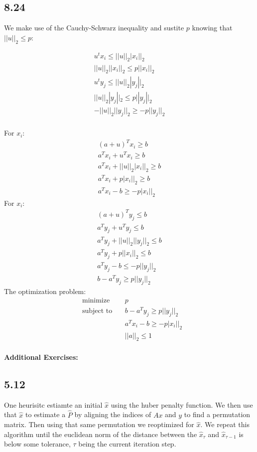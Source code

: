 \documentclass[12pt]{article}
\newenvironment{proposition}[2][Proposition]{\begin{trivlist}
\item[\hskip \labelsep {\bfseries #1}\hskip \labelsep {\bfseries #2.}]}{\end{trivlist}}
\begin{document}
\subsection*{8.24}
We make use of the Cauchy-Schwarz inequality and sustite $p$ knowing that $||u||_2 \le p$:
\begin{proposition}{1}
\begin{align}
u^tx_i \le ||u||_2|x_i||_2\\
||u||_2||x_i||_2 \le p||x_i||_2\\
u^ty_j \le ||u||_2|y_j||_2\\
||u||_2|y_j||_2 \le p||y_j||_2\\
-||u||_2||y_j||_2 \ge -p||y_j||_2\\
\end{align}
\end{proposition}
For $x_i$:
\begin{equation*}
\begin{aligned}
(a+u)^Tx_i \ge b\\
a^Tx_i+u^Tx_i \ge b\\
a^Tx_i+||u||_2|x_i||_2 \ge b\\
a^Tx_i+p|x_i||_2 \ge b\\
a^Tx_i-b \ge -p|x_i||_2
\end{aligned}
\end{equation*}
For $x_i$:
\begin{equation*}
\begin{aligned}
(a+u)^Ty_j \le b\\
a^Ty_j+u^Ty_j \le b\\
a^Ty_j+||u||_2||y_j||_2 \le b\\
a^Ty_j+p||x_i||_2 \le b\\
a^Ty_j-b \le -p||y_j||_2\\
b-a^Ty_j \ge p||y_j||_2
\end{aligned}
\end{equation*}
The optimization problem:
\begin{equation*}
\begin{aligned}
& \underset{}{\text{minimize}}
& & p\\
& \text{subject to}\
& & b-a^Ty_j \ge p||y_j||_2\\
&&& a^Tx_i-b \ge -p|x_i||_2\\
&&& ||a||_2 \le 1
\end{aligned}
\end{equation*}\\
\textbf{Additional Exercises:}\\
\subsection*{5.12}
One heurisitc estiamte an initial $\hat{x}$ using the huber penalty function. We then use that $\hat{x}$ to estimate a $\hat{P}$ by aligning the indices of $Ax$ and $y$ to find a permutation matrix. Then using that same permutation we reoptimized for $\hat{x}$. We repeat this algorithm until the euclidean norm of the distance between the $\hat{x}_{\tau}$ and $\hat{x}_{\tau-1}$ is below some tolerance, $\tau$ being the current iteration step.
\end{document}
